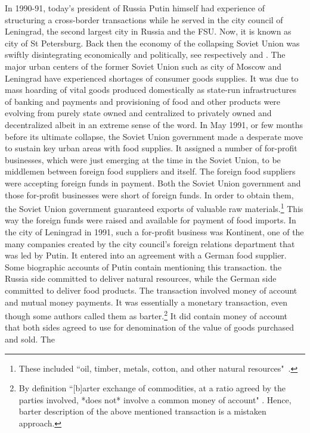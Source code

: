In 1990-91, today's president of Russia Putin himself had experience of
structuring a cross-border transactions while he served in the city
council of Leningrad, the second largest city in Russia and the FSU.
Now, it is known as city of St Petersburg. Back then the economy of the
collapsing Soviet Union was swiftly disintegrating economically and
politically, see respectively \citep{woodruff2000} and \citep{zubok2021}. The
major urban centers of the former Soviet Union such as city of Moscow
and Leningrad have experienced shortages of consumer goods supplies. It
was due to mass hoarding of vital goods produced domestically as
state-run infrastructures of banking and payments and provisioning of
food and other products were evolving from purely state owned and
centralized to privately owned and decentralized albeit in an extreme
sense of the word. In May 1991, or few months before its ultimate
collapse, the Soviet Union government made a desperate move to sustain
key urban areas with food supplies. It assigned a number of for-profit
businesses, which were just emerging at the time in the Soviet Union, to
be middlemen between foreign food suppliers and itself. The foreign food
suppliers were accepting foreign funds in payment. Both the Soviet Union
government and those for-profit businesses were short of foreign funds.
In order to obtain them, the Soviet Union government guaranteed exports
of valuable raw materials.\footnote{These included ``oil, timber, metals, cotton, and other natural resources"~\citep[p.~121]{gessen2014}.} This way the foreign funds were raised
and available for payment of food imports. In the city of Leningrad in
1991, such a for-profit business was Kontinent, one of the many
companies created by the city council's foreign relations department
that was led by Putin. It entered into an agreement with a German food
supplier. Some biographic accounts of Putin contain mentioning this
transaction. the Russia side committed to deliver natural resources,
while the German side committed to deliver food products. The
transaction involved money of account and mutual money payments. It was
essentially a monetary transaction, even though some authors called them
as barter.\footnote{By definition ``[b]arter exchange of commodities, at a ratio
    agreed by the parties involved, *does not* involve a common money of
    account" \citep[p.~107, emphasis added]{ingham2020}. Hence, barter
    description of the above mentioned transaction is a mistaken
    approach.} It did contain money of account that both sides agreed
to use for denomination of the value of goods purchased and sold. The
